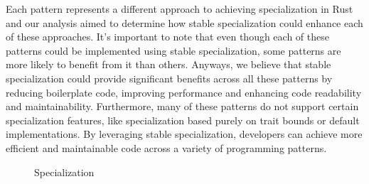 Each pattern represents a different approach to achieving specialization in Rust and our analysis aimed to determine how stable specialization could enhance each of these approaches.
It's important to note that even though each of these patterns could be implemented using stable specialization, some patterns are more likely to benefit from it than others.
Anyways, we believe that stable specialization could provide significant benefits across all these patterns by reducing boilerplate code, improving performance and enhancing code readability and maintainability.
Furthermore, many of these patterns do not support certain specialization features, like specialization based purely on trait bounds or default implementations.
By leveraging stable specialization, developers can achieve more efficient and maintainable code across a variety of programming patterns.

\begin{figure}[htbp!]
	\centering
	\begin{minipage}{0.49\textwidth}
		\centering
		\captionsetup{type=listing,skip=2pt}
		\caption{Unstable Specialization}
		\label{fig:unstable-specialization}
	\end{minipage}
	\hfill
	\begin{minipage}{0.49\textwidth}
		\centering
		\captionsetup{type=listing,skip=2pt}
		\caption{\mytool{} Specialization}
		\label{fig:tool-specialization}
	\end{minipage}
\end{figure}

